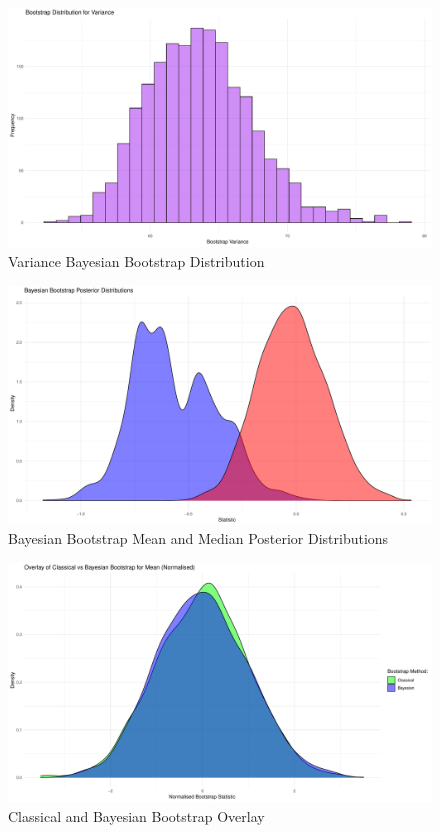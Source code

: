 \documentclass[12pt]{report} %
\begin{document}
\begin{figure}[ht]
    \centering
    \includegraphics[width=\textwidth]{VarBS.pdf}
    \caption{Variance Bayesian Bootstrap Distribution}
    \label{fig:varBS}
\end{figure}

\begin{figure}[ht]
    \centering
    \includegraphics[width=\textwidth]{BayesBSPost.pdf}
    \caption{Bayesian Bootstrap Mean and Median Posterior Distributions}
    \label{fig:BayesBSPost}
\end{figure}

\begin{figure}[ht]
    \centering    \includegraphics[width=\textwidth]{ClassBayesNorm.pdf}
    \caption{Classical and Bayesian Bootstrap Overlay}
    \label{fig:ClassBayesNorm}
\end{figure}
\end{document}
